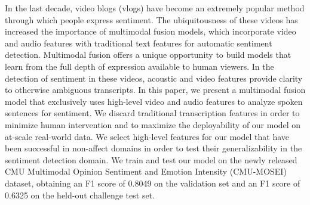 In the last decade, video blogs (vlogs) have become an extremely popular method through which people express sentiment. The ubiquitousness of these videos has increased the importance of multimodal fusion models, which incorporate video and audio features with traditional text features for automatic sentiment detection. Multimodal fusion offers a unique opportunity to build models that learn from the full depth of expression available to human viewers. In the detection of sentiment in these videos, acoustic and video features provide clarity to otherwise ambiguous transcripts. In this paper, we present a multimodal fusion model that exclusively uses high-level video and audio features to analyze spoken sentences for sentiment. We discard traditional transcription features in order to minimize human intervention and to maximize the deployability of our model on at-scale real-world data. We select high-level features for our model that have been successful in non-affect domains in order to test their generalizability in the sentiment detection domain. We train and test our model on the newly released CMU Multimodal Opinion Sentiment and Emotion Intensity (CMU-MOSEI) dataset, obtaining an F1 score of 0.8049 on the validation set and an F1 score of 0.6325 on the held-out challenge test set.

